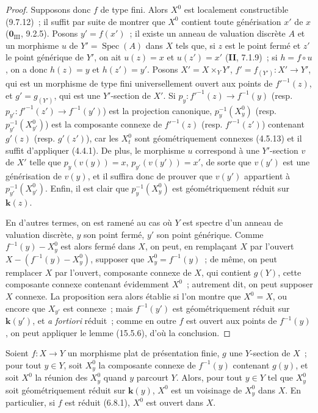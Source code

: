 \begin{proof}
Supposons donc $f$ de type fini. Alors $X^0$ est localement constructible (9.7.12)~; il suffit par suite de montrer que $X^0$ contient toute générisation $x'$ de $x$ ($\mathbf{0}_{\mathrm{III}}$, 9.2.5). Posons $y'=f(x')$~; il existe un anneau de valuation discrète $A$ et un morphisme $u$ de $Y'=\operatorname{Spec}(A)$ dans $X$ tels que, si $z$ est le point fermé et $z'$ le point générique de $Y'$, on ait $u(z)=x$ et $u(z')=x'$ (\textbf{II}, 7.1.9)~; si $h=f\circ u$, on a donc $h(z)=y$ et $h(z')=y'$. Posons $X'=X\times_Y Y'$, $f'=f_{(Y')}:X'\to Y'$, qui est un morphisme de type fini universellement ouvert aux points de $f'^{-1}(z)$, et $g'=g_{(Y')}$, qui est une $Y'$-section de $X'$. Si $p_y:f'^{-1}(z)\to f^{-1}(y)$ (resp. $p_{y'}:f'^{-1}(z')\to f^{-1}(y')$) est la projection canonique, $p_y^{-1}(X_y^0)$ (resp. $p_{y'}^{-1}(X_{y'}^0)$) est la composante connexe de $f'^{-1}(z)$ (resp. $f'^{-1}(z')$) contenant $g'(z)$ (resp. $g'(z')$), car les $X_t^0$ sont géométriquement connexes (4.5.13) et il suffit d'appliquer (4.4.1). De plus, le morphisme $u$ correspond à une $Y'$-section $v$ de $X'$ telle que $p_y(v(y))=x$, $p_{y'}(v(y'))=x'$, de sorte que $v(y')$ est une générisation de $v(y)$, et il suffira donc de prouver que $v(y')$ appartient à $p_{y'}^{-1}(X_{y'}^0)$. Enfin, il est clair que $p_y^{-1}(X_y^0)$ est géométriquement réduit sur $\mathbf{k}(z)$.

En d'autres termes, on est ramené au cas où $Y$ est spectre d'un anneau de valuation discrète, $y$ son point fermé, $y'$ son point générique. Comme $f^{-1}(y)-X_y^0$ est alors fermé dans $X$, on peut, en remplaçant $X$ par l'ouvert $X-(f^{-1}(y)-X_y^0)$, supposer que $X_y^0=f^{-1}(y)$~; de même, on peut remplacer $X$ par l'ouvert, composante connexe de $X$, qui contient $g(Y)$, cette composante connexe contenant évidemment $X^0$~; autrement dit, on peut supposer $X$ connexe. La proposition sera alors établie si l'on montre que $X^0=X$, ou encore que $X_{y'}$ est connexe~; mais $f^{-1}(y')$ est géométriquement réduit sur $\mathbf{k}(y')$, et \emph{a fortiori} réduit~; comme en outre $f$ est ouvert aux points de $f^{-1}(y)$, on peut appliquer le lemme (15.5.6), d'où la conclusion.
\end{proof}

\begin{corollary}[15.6.5]
\label{IV.15.6.5-fr}
Soient $f:X\to Y$ un morphisme plat de présentation finie, $g$ une $Y$-section de $X$~; pour tout $y\in Y$, soit $X_y^0$ la composante connexe de $f^{-1}(y)$ contenant $g(y)$, et soit $X^0$ la réunion des $X_y^0$ quand $y$ parcourt $Y$. Alors, pour tout $y\in Y$ tel que $X_y^0$ soit géométriquement réduit sur $\mathbf{k}(y)$, $X^0$ est un voisinage de $X_y^0$ dans $X$. En particulier, si $f$ est réduit (6.8.1), $X^0$ est ouvert dans $X$.
\end{corollary}

